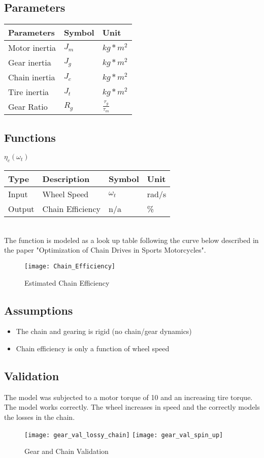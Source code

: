 \documentclass[../SimBALink.tex]{subfiles}
\begin{document}
\subsection{Parameters}
	\begin{tabular}{ l | l | l  }
		Parameters					&	Symbol		&	Unit		\\	\hline
		Motor inertia		&	$J_m$		&	 $kg*m^2$ \\ 
		Gear inertia		&	$J_g$		&	 $kg*m^2$ \\ 
		Chain inertia		&	$J_c$		&	 $kg*m^2$ \\ 
		Tire inertia		&	$J_t$		&	 $kg*m^2$ \\ 
		Gear Ratio			&	$R_g$		&	$\frac{\tau_g}{\tau_m}$
	\end{tabular}
	
\subsection{Functions}
$\eta_c(\omega_t)$ \\
	\begin{tabular}{ l | l | l | l }
		Type				& Description		&	Symbol		&	Unit		\\	\hline
		Input 				& Wheel Speed		&	$\omega_t$  & 	rad/s		\\
		Output 				& Chain Efficiency	&	n/a			&	\%
	\end{tabular} \\

The function is modeled as a look up table following the curve below described in the paper "Optimization of Chain Drives in Sports Motorcycles".

\begin{figure}[h!]
  \centering
  \texttt{[image: Chain\_Efficiency]}
  \caption{Estimated Chain Efficiency}
\end{figure}

\subsection{Assumptions}
\begin{itemize}
  \item The chain and gearing is rigid (no chain/gear dynamics)
  \item Chain efficiency is only a function of wheel speed
\end{itemize}

\subsection{Validation}

The model was subjected to a motor torque of 10 and an increasing tire torque. The model works correctly. The wheel increases in speed and the correctly models the losses in the chain.


\begin{figure}[H]
\center
  \texttt{[image: gear\_val\_lossy\_chain]}
  \texttt{[image: gear\_val\_spin\_up]}
  \caption{Gear and Chain Validation}
\end{figure}
\end{document}
